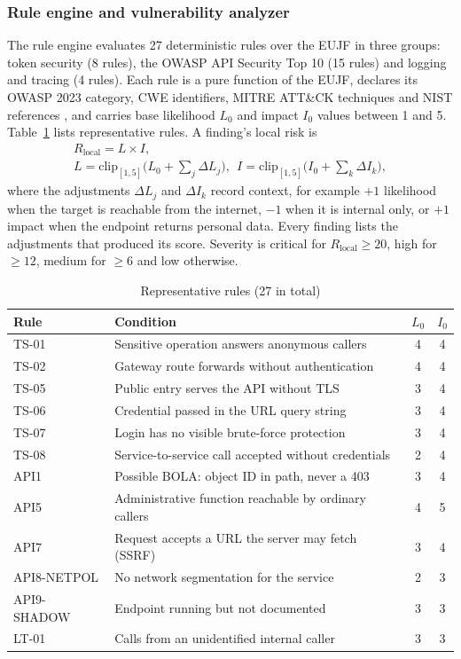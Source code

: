 \documentclass[conference]{IEEEtran}
\begin{document}
\subsubsection{Rule engine and vulnerability analyzer}
The rule engine evaluates 27 deterministic rules over the EUJF in three groups: token security (8 rules), the OWASP API Security Top 10 (15 rules) and logging and tracing (4 rules). Each rule is a pure function of the EUJF, declares its OWASP 2023 category, CWE identifiers, MITRE ATT\&CK techniques \cite{attack,cwe} and NIST references \cite{nist_800_204,nist_800_207,nist_800_190,r10}, and carries base likelihood $L_0$ and impact $I_0$ values between 1 and 5. Table~\ref{tab:rules} lists representative rules. A finding's local risk is
\begin{gather}
R_{\mathrm{local}} = L \times I, \label{eq:local}\\
L = \mathrm{clip}_{[1,5]}\big(L_0 + \textstyle\sum_j \Delta L_j\big),\ \ I = \mathrm{clip}_{[1,5]}\big(I_0 + \textstyle\sum_k \Delta I_k\big), \nonumber
\end{gather}
where the adjustments $\Delta L_j$ and $\Delta I_k$ record context, for example $+1$ likelihood when the target is reachable from the internet, $-1$ when it is internal only, or $+1$ impact when the endpoint returns personal data. Every finding lists the adjustments that produced its score. Severity is critical for $R_{\mathrm{local}}\ge 20$, high for $\ge 12$, medium for $\ge 6$ and low otherwise.

\begin{table}[t]
\caption{Representative rules (27 in total)}
\label{tab:rules}
\centering
\footnotesize
\begin{tabular}{@{}p{1.35cm}p{4.35cm}cc@{}}
\toprule
Rule & Condition & $L_0$ & $I_0$ \\
\midrule
TS-01 & Sensitive operation answers anonymous callers & 4 & 4 \\
TS-02 & Gateway route forwards without authentication & 4 & 4 \\
TS-05 & Public entry serves the API without TLS & 3 & 4 \\
TS-06 & Credential passed in the URL query string & 3 & 4 \\
TS-07 & Login has no visible brute-force protection & 3 & 4 \\
TS-08 & Service-to-service call accepted without credentials & 2 & 4 \\
API1 & Possible BOLA: object ID in path, never a 403 & 3 & 4 \\
API5 & Administrative function reachable by ordinary callers & 4 & 5 \\
API7 & Request accepts a URL the server may fetch (SSRF) & 3 & 4 \\
API8-NETPOL & No network segmentation for the service & 2 & 3 \\
API9-SHADOW & Endpoint running but not documented & 3 & 3 \\
LT-01 & Calls from an unidentified internal caller & 3 & 3 \\
\bottomrule
\end{tabular}
\end{table}
\end{document}
